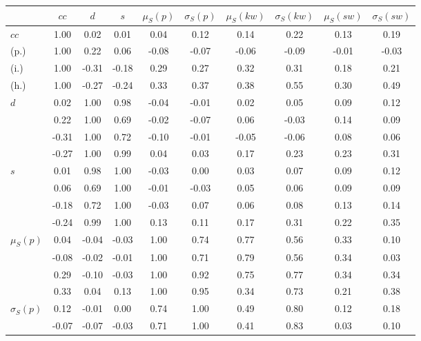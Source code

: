 \begin{table*}[h!]
\begin{center}
\begin{tabular}{| l | c | c | c | c | c | c | c | c | c |}\hline
 & $cc$ & $d$ & $s$ & $\mu_S(p)$ & $\sigma_S(p)$ & $\mu_S(kw)$ & $\sigma_S(kw)$ & $\mu_S(sw)$ & $\sigma_S(sw)$ \\\hline
$cc$ & 1.00  & 0.02  & 0.01  & 0.04  & 0.12  & 0.14  & 0.22  & 0.13  & 0.19 \\\hline
(p.) & 1.00  & 0.22  & 0.06  & -0.08  & -0.07  & -0.06  & -0.09  & -0.01  & -0.03 \\\hline
(i.) & 1.00  & -0.31  & -0.18  & 0.29  & 0.27  & 0.32  & 0.31  & 0.18  & 0.21 \\\hline
(h.) & 1.00  & -0.27  & -0.24  & 0.33  & 0.37  & 0.38  & 0.55  & 0.30  & 0.49 \\\hline
$d$ & 0.02  & 1.00  & 0.98  & -0.04  & -0.01  & 0.02  & 0.05  & 0.09  & 0.12 \\\hline
 & 0.22  & 1.00  & 0.69  & -0.02  & -0.07  & 0.06  & -0.03  & 0.14  & 0.09 \\\hline
 & -0.31  & 1.00  & 0.72  & -0.10  & -0.01  & -0.05  & -0.06  & 0.08  & 0.06 \\\hline
 & -0.27  & 1.00  & 0.99  & 0.04  & 0.03  & 0.17  & 0.23  & 0.23  & 0.31 \\\hline
$s$ & 0.01  & 0.98  & 1.00  & -0.03  & 0.00  & 0.03  & 0.07  & 0.09  & 0.12 \\\hline
 & 0.06  & 0.69  & 1.00  & -0.01  & -0.03  & 0.05  & 0.06  & 0.09  & 0.09 \\\hline
 & -0.18  & 0.72  & 1.00  & -0.03  & 0.07  & 0.06  & 0.08  & 0.13  & 0.14 \\\hline
 & -0.24  & 0.99  & 1.00  & 0.13  & 0.11  & 0.17  & 0.31  & 0.22  & 0.35 \\\hline
$\mu_S(p)$ & 0.04  & -0.04  & -0.03  & 1.00  & 0.74  & 0.77  & 0.56  & 0.33  & 0.10 \\\hline
 & -0.08  & -0.02  & -0.01  & 1.00  & 0.71  & 0.79  & 0.56  & 0.34  & 0.03 \\\hline
 & 0.29  & -0.10  & -0.03  & 1.00  & 0.92  & 0.75  & 0.77  & 0.34  & 0.34 \\\hline
 & 0.33  & 0.04  & 0.13  & 1.00  & 0.95  & 0.34  & 0.73  & 0.21  & 0.38 \\\hline
$\sigma_S(p)$ & 0.12  & -0.01  & 0.00  & 0.74  & 1.00  & 0.49  & 0.80  & 0.12  & 0.18 \\\hline
 & -0.07  & -0.07  & -0.03  & 0.71  & 1.00  & 0.41  & 0.83  & 0.03  & 0.10 \\\hline

\end{tabular}
\end{center}
\end{table*}
